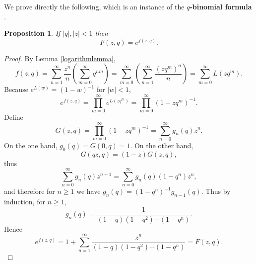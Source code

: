 \documentclass{article}
\newtheorem{proposition}[theorem]{Proposition}
\begin{document}
We prove directly the following, which is an instance of the \textbf{$q$-binomial formula}  \cite[p.~17, Theorem 2.1]{andrews}.

\begin{proposition}
If $|q|, |z|<1$ then
\[
F(z,q) = e^{f(z,q)}.
\]
\label{qbinomial}
\end{proposition}
\begin{proof}
By Lemma \ref{logarithmlemma},
\[
f(z,q)=\sum_{n=1}^\infty \frac{z^n}{n} \left( \sum_{m=0}^\infty q^{nm}\right)
=\sum_{m=0}^\infty \left( \sum_{n=1}^\infty \frac{(zq^m)^n}{n} \right)
=\sum_{m=0}^\infty L(zq^m).
\]
Because $e^{L(w)}=(1-w)^{-1}$ for $|w|<1$,
\[
e^{f(z,q)} = \prod_{m=0}^\infty e^{L(zq^m)}
=\prod_{m=0}^\infty (1-zq^m)^{-1}.
\]
Define
\[
G(z,q) = \prod_{m=0}^\infty (1-zq^m)^{-1} = \sum_{n=0}^\infty g_n(q) z^n.
\]
On the one hand, $g_0(q) = G(0,q) = 1$. On the other hand,
\[
G(qz,q) = (1-z) G(z,q),
\]
thus
\[
\sum_{n=0}^\infty g_n(q) z^{n+1} = \sum_{n=0}^\infty g_n(q)(1-q^n) z^n,
\]
and therefore for $n \geq 1$ we have 
$g_n(q) = (1-q^n)^{-1} g_{n-1}(q)$. 
Thus by induction, for $n \geq 1$,
\[
g_n(q) = \frac{1}{(1-q)(1-q^2)\cdots (1-q^n)}.
\]
Hence
\[
e^{f(z,q)} = 1 + \sum_{n=1}^\infty  \frac{z^n}{(1-q)(1-q^2)\cdots (1-q^n)} = F(z,q).
\]
\end{proof}
\end{document}
